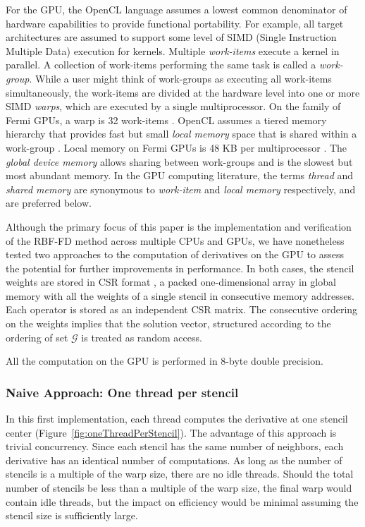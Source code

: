 For the GPU, the OpenCL language \cite{OpenCL2009} assumes a lowest common denominator of hardware capabilities to provide functional portability. For example, all target architectures are assumed to support some level of SIMD (Single Instruction Multiple Data) execution for kernels. Multiple \textit{work-items} execute a kernel in parallel. 
A collection of work-items performing the same task is called a \textit{work-group}. While a user might think of work-groups as executing all work-items simultaneously, the work-items are divided at the hardware level into one or more SIMD \textit{warps}, which are executed by a single multiprocessor. On the family of Fermi GPUs, a warp is 32 work-items \cite{CudaGuide2011}. 
OpenCL assumes a tiered memory hierarchy that provides fast but small \textit{local memory} space that is shared within a work-group \cite{OpenCL2009}. Local memory on Fermi GPUs is 48 KB per multiprocessor \cite{CudaGuide2011}. The \textit{global device memory} allows sharing between work-groups and is the slowest but most abundant memory. 
In the GPU computing literature, the terms \textit{thread} and \textit{shared memory} are synonymous to \textit{work-item} and \textit{local memory} respectively, and are preferred below. 

Although the primary focus of this paper is the implementation 
and verification of the RBF-FD method across multiple CPUs and GPUs, 
we have nonetheless tested two approaches to the computation of derivatives 
on the GPU to 
assess the potential for further improvements in performance. 
In both cases, the stencil weights are stored in CSR format \cite{Bell2009}, 
a packed one-dimensional array in global memory with all the weights 
of a single stencil in consecutive memory addresses. Each operator is stored as an independent CSR matrix. The consecutive ordering on the weights implies that the solution vector, structured according to the ordering of set $\mathcal{G}$ is treated as random access. 

All the computation on the GPU is performed in 8-byte double precision. 


\subsubsection{Naive Approach: One thread per stencil}

In this first implementation, each thread computes 
the derivative at one stencil center  (Figure~\ref{fig:oneThreadPerStencil}). 
The advantage of this approach is trivial concurrency.  Since each stencil has the same number of neighbors, each derivative has an identical number of computations. As long as the number of stencils is a multiple of the warp size, there are no idle threads. Should the total number of stencils be less than a multiple of the warp size, the final warp would contain idle threads, but the impact on efficiency would be minimal assuming the stencil size is sufficiently large. 

